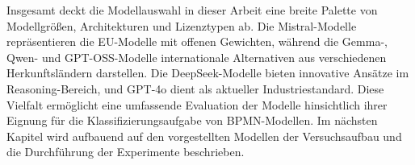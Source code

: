 Insgesamt deckt die Modellauswahl in dieser Arbeit eine breite Palette von Modellgrößen, Architekturen und Lizenztypen ab. Die Mistral-Modelle repräsentieren die \ac{EU}-Modelle mit offenen Gewichten, während die Gemma-, Qwen- und GPT-OSS-Modelle internationale Alternativen aus verschiedenen Herkunftsländern darstellen. Die DeepSeek-Modelle bieten innovative Ansätze im Reasoning-Bereich, und GPT-4o dient als aktueller Industriestandard. Diese Vielfalt ermöglicht eine umfassende Evaluation der Modelle hinsichtlich ihrer Eignung für die Klassifizierungsaufgabe von \ac{BPMN}-Modellen. Im nächsten Kapitel wird aufbauend auf den vorgestellten Modellen der Versuchsaufbau und die Durchführung der Experimente beschrieben.